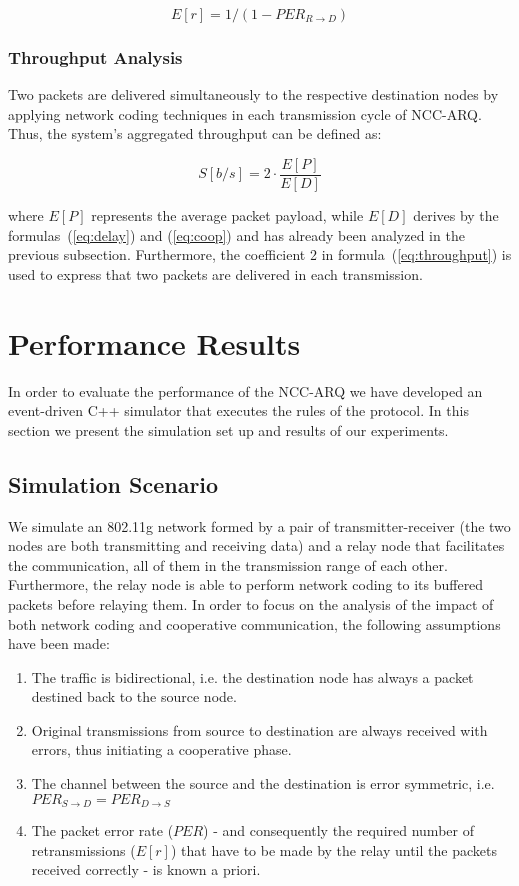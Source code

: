 \documentclass[conference]{IEEEtran}
\begin{document}
\begin{equation}
\label{eq:retr}
 	E[r]=1/(1-PER_{R\rightarrow D})
\end{equation}

\subsubsection{Throughput Analysis}

Two packets are delivered simultaneously to the respective destination nodes by applying network coding techniques in each transmission cycle of NCC-ARQ. Thus, the system's aggregated throughput can be defined as:

\begin{equation}
\label{eq:throughput}
 	S[b/s]= 2 \cdot \frac{E[P]}{E[D]}
\end{equation}

where $E[P]$ represents the average packet payload, while $E[D]$ derives by the formulas~(\ref{eq:delay}) and (\ref{eq:coop}) and has already been analyzed in the previous subsection. Furthermore, the coefficient 2 in formula~(\ref{eq:throughput}) is used to express that two packets are delivered in each transmission.

\section{Performance Results}
\label{sec:results}

In order to evaluate the performance of the NCC-ARQ we have developed an event-driven C++ simulator that executes the rules of the protocol. In this section we present the simulation set up and results of our experiments.

\subsection{Simulation Scenario}

We simulate an 802.11g network formed by a pair of transmitter-receiver (the two nodes are both transmitting and receiving data) and a relay node that facilitates the communication, all of them in the transmission range of each other. Furthermore, the relay node is able to perform network coding to its buffered packets before relaying them. In order to focus on the analysis of the impact of both network coding and cooperative communication, the following assumptions have been made:
\begin{enumerate}
\item The traffic is bidirectional, i.e. the destination node has always a packet destined back to the source node.
\item Original transmissions from source to destination are always received with errors, thus initiating a cooperative phase.
\item The channel between the source and the destination is error symmetric, i.e. $PER_{S\rightarrow D} =PER_{D\rightarrow S}$
\item The packet error rate ($PER$) - and consequently the  required number of retransmissions ($E[r]$) that have to be made by the relay until the packets received correctly - is known a priori.
\end{enumerate}
\end{document}
